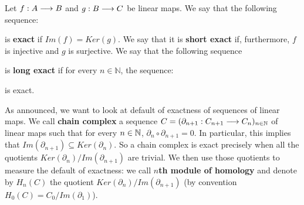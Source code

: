 \begin{defi}
Let $f : A \longrightarrow B$ and $g : B \longrightarrow C$ be linear maps. We say that the following sequence:
\begin{center}
\end{center}
is \textbf{exact} if $Im(f) = Ker(g)$.
We say that it is \textbf{short exact} if, furthermore, $f$ is injective and $g$ is surjective.
We say that the following sequence 
\begin{center}
\end{center}
is \textbf{long exact} if for every $n\in \mathbb{N}$, the sequence:
\begin{center}
\end{center}
is exact.
\end{defi}
 
As announced, we want to look at default of exactness of sequences of linear maps. We call \textbf{chain complex} a sequence $C = (\partial_{n+1} : C_{n+1} \longrightarrow C_n)_{n\in\mathbb{N}}$ of linear maps such that for every $n \in \mathbb{N}$, $\partial_n\circ\partial_{n+1} = 0$. In particular, this implies that $Im(\partial_{n+1}) \subseteq Ker(\partial_n)$. So a chain complex is exact precisely when all the quotients $Ker(\partial_n)/Im(\partial_{n+1})$ are trivial. We then use those quotients to measure the default of exactness: we call \textbf{$n$th module of homology} and denote by $H_n(C)$ the quotient $Ker(\partial_n)/Im(\partial_{n+1})$ (by convention $H_0(C) = C_0/Im(\partial_1)$).


